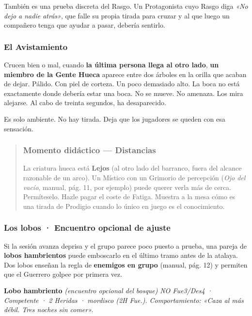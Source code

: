\documentclass[10pt,a4paper]{article}
\begin{document}
También es una prueba discreta del Rasgo. Un Protagonista cuyo Rasgo diga \emph{«No dejo a nadie atrás»}, que falle su propia tirada para cruzar y al que luego un compañero tenga que ayudar a pasar, debería sentirlo.

\subsubsection{El Avistamiento}\label{el-avistamiento}

Crucen bien o mal, cuando \textbf{la última persona llega al otro lado}, \textbf{un miembro de la Gente Hueca} aparece entre dos árboles en la orilla que acaban de dejar. Pálido. Con piel de corteza. Un poco demasiado alto. La boca no está exactamente donde debería estar una boca. No se mueve. No amenaza. Los mira alejarse. Al cabo de treinta segundos, ha desaparecido.

Es solo ambiente. No hay tirada. Deja que los jugadores se queden con esa sensación.

\begin{quote}
\subsubsection{Momento didáctico --- Distancias}\label{consejo-distancias}

La criatura hueca está \textbf{Lejos} (al otro lado del barranco, fuera del alcance razonable de un arco). Un Místico con un Grimorio de percepción (\emph{Ojo del vacío}, manual, pág. 11, por ejemplo) puede querer verla más de cerca. Permíteselo. Hazle pagar el coste de Fatiga. Muestra a la mesa cómo es una tirada de Prodigio cuando lo único en juego es el conocimiento.
\end{quote}

\subsubsection{Los lobos · Encuentro opcional de ajuste}\label{los-lobos-encuentro-opcional}

Si la sesión avanza deprisa y el grupo parece poco puesto a prueba, una pareja de \textbf{lobos hambrientos} puede emboscarlo en el último tramo antes de la atalaya. Dos lobos enseñan la regla de \textbf{enemigos en grupo} (manual, pág. 12) y permiten que el Guerrero golpee por primera vez. \par\smallskip\begin{rpgnote}[fontupper=\normalfont]\textbf{Lobo hambriento} \emph{(encuentro opcional del bosque)} \emph{NO Fue3/Des4 · Competente · 2 Heridas · mordisco (2H Fue.).} \emph{Comportamiento: «Caza al más débil. Tres noches sin comer».}\end{rpgnote}
\end{document}
